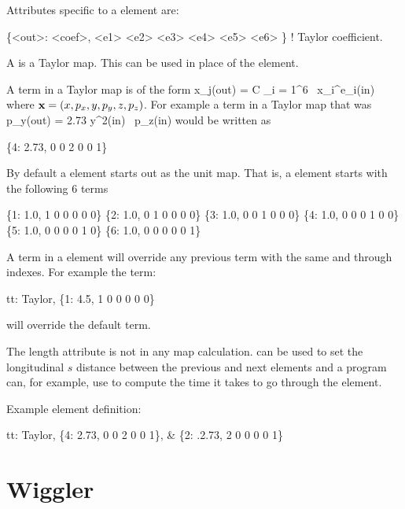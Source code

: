 {{Attributes specific to a  element are:
\begin{example}
  \{<out>: <coef>, <e1> <e2> <e3> <e4> <e5> <e6> \}  ! Taylor coefficient. 
\end{example}

A  is a Taylor map. This can be used in place of the \mad 
{} element.

A term in a Taylor map is of the form
\Begineq
  x_j({\rm out}) = C \cdot \Pi_{i = 1}^6 \, x_i^{e_i}({\rm in})
\Endeq
where ${\bf x} = (x, p_x, y, p_y, z, p_z)$. For example a term
in a Taylor map that was
\Begineq
  p_y({\rm out}) = 2.73 \cdot y^2({\rm in}) \, p_z({\rm in})
\Endeq
would be written as
\begin{example}
  \{4: 2.73, 0 0 2 0 0 1\}
\end{example}

By default a  element starts out as the unit map. 
That is, a  element starts with the following 6 terms
\begin{example}
  \{1: 1.0, 1 0 0 0 0 0\}
  \{2: 1.0, 0 1 0 0 0 0\}
  \{3: 1.0, 0 0 1 0 0 0\}
  \{4: 1.0, 0 0 0 1 0 0\}
  \{5: 1.0, 0 0 0 0 1 0\}
  \{6: 1.0, 0 0 0 0 0 1\}
\end{example}
A term in a  element will override any previous term
with the same  and  through  indexes. For example the term:
\begin{example}
  tt: Taylor, \{1: 4.5, 1 0 0 0 0 0\} 
\end{example}
will override the default  term.

The  length attribute is not in any map calculation.  can
be used to set the longitudinal $s$ distance between the previous and
next elements and a program can, for example, use  to compute
the time it takes to go through the element.

Example  element definition:
\begin{example}
  tt: Taylor, \{4:  2.73, 0 0 2 0 0 1\}, &
              \{2: .2.73, 2 0 0 0 0 1\}
\end{example}

\section{Wiggler} 
\label{s:wiggler}

}}

